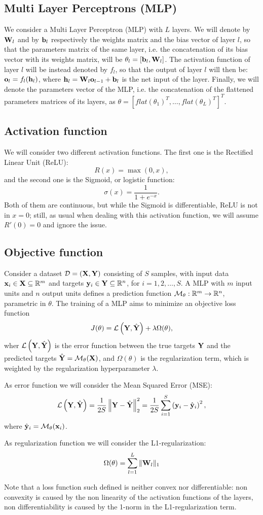 \subsection{Multi Layer Perceptrons (MLP)}
We consider a Multi Layer Perceptron (MLP) with $L$ layers. We will denote by $\mathbf{W}_l$ and by $\mathbf{b}_l$ respectively the weights matrix and the bias vector of layer $l$, so that the parameters matrix of the same layer, i.e. the concatenation of its bias vector with its weights matrix, will be $\theta_l = \left[\mathbf{b}_l, \mathbf{W}_l\right]$. The activation function of layer $l$ will be instead denoted by $f_l$, so that the output of layer $l$ will then be: $\mathbf{o}_l = f_l(\mathbf{h}_l)$, where $\mathbf{h}_l = \mathbf{W}_l\mathbf{o}_{l - 1} + \mathbf{b}_l$ is the net input of the layer. Finally, we will denote the parameters vector of the MLP, i.e. the concatenation of the flattened parameters matrices of its layers, as $\theta = \left[flat(\theta_1)^T, \ldots, flat(\theta_L)^T\right]^T$.

\subsection{Activation function}
We will consider two different activation functions. The first one is the Rectified Linear Unit (ReLU):
\[
    R(x) = \max(0, x),
\]
and the second one is the Sigmoid, or logistic function:
\[
    \sigma(x) = \frac{1}{1 + e^{-x}}.
\]
Both of them are continuous, but while the Sigmoid is differentiable, ReLU is not in $x = 0$; still, as usual when dealing with this activation function, we will assume $R'(0) = 0$ and ignore the issue.

\subsection{Objective function}
\label{obj_fun}
Consider a dataset $\mathcal{D} = (\mathbf{X}, \mathbf{Y}) $ consisting of $S$ samples, with input data $\mathbf{x}_i \in \mathbf{X} \subseteq \mathbb{R}^m$ and targets $\mathbf{y}_i \in \mathbf{Y} \subseteq \mathbb{R}^n$, for $i = 1, 2, \ldots, S$. A MLP with $m$ input units and $n$ output units defines a prediction function $\mathcal{M}_\theta: \mathbb{R}^m \rightarrow \mathbb{R}^n$, parametric in $\theta$. The training of a MLP aims to minimize an objective loss function
\[
J(\theta) = \mathcal{L}\left(\mathbf{Y},\hat{\mathbf{Y}}\right) + \lambda\Omega(\theta),
\]
wher $\mathcal{L}\left(\mathbf{Y}, \hat{\mathbf{Y}}\right)$ is the error function between the true targets $\mathbf{Y}$ and the predicted targets $\hat{\mathbf{Y}} = \mathcal{M}_\theta(\mathbf{X})$, and $\Omega(\theta)$ is the regularization term, which is weighted by the regularization hyperparameter $\lambda$.

As error function we will consider the Mean Squared Error (MSE):
\[
    \mathcal{L}\left(\mathbf{Y}, \hat{\mathbf{Y}}\right) = \frac{1}{2S} \left\Vert \mathbf{Y} - \hat{\mathbf{Y}} \right\Vert_2^2 = \frac{1}{2S} \sum_{i=1}^S \left(\mathbf{y}_i - \hat{\mathbf{y}}_i\right)^2,
\]
where $\hat{\mathbf{y}}_i = \mathcal{M}_\theta(\mathbf{x}_i)$.

As regularization function  we will consider the L1-regularization:
\[
    \Omega(\theta) = \sum_{l=1}^L \Vert \mathbf{W}_l \Vert_{1}
\]

Note that a loss function such defined is neither convex nor differentiable: non convexity is caused by the non linearity of the activation functions of the layers, non differentiability is caused by the 1-norm in the L1-regularization term.
